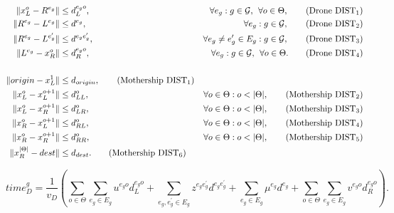 \begin{align*}
\|x_L^o- R^{e_g}\| & \leq  d_L^{e_go},  &\forall e_g:g\in \mathcal{G}, \:\:\forall o\in \Theta, \tag{Drone DIST$_{1}$} \label{eq:drone-d1-async}\\
\|R^{e_g}- L^{e_g}\| & \leq  d^{e_g},  &\forall e_g:g\in \mathcal{G}, \tag{Drone DIST$_{2}$} \label{eq:drone-d2-async}\\
\|R^{e_g}- L^{e'_g}\| & \leq  d^{e_ge'_g}, &\forall e_g\neq e_g'\in E_g:g\in \mathcal{G}, \tag{Drone DIST$_{3}$} \label{eq:drone-d3-async}\\
\|L^{e_g}- x_R^o\| & \leq  d_R^{e_go}, &\forall e_g:g\in \mathcal{G},\:\:\forall o\in \Theta. \tag{Drone DIST$_{4}$} \label{eq:drone-d4-async}\\\\
\|origin - x_L^1\| & \leq d_{origin}, \tag{Mothership DIST$_1$}\label{eq:mothership-d1-async}\\
\|x_L^o - x_L^{o+1}\| & \leq d_{LL}^{o}, &\forall o\in\Theta:o<|\Theta|, \tag{Mothership DIST$_{2}$}\label{eq:mothership-d2-async}\\
\|x_L^o - x_R^{o+1}\| & \leq d_{LR}^{o}, &\forall o\in\Theta:o<|\Theta|, \tag{Mothership DIST$_{3}$}\label{eq:mothership-d3-async}\\
\|x_R^o - x_L^{o+1}\| & \leq d_{RL}^{o}, &\forall o\in\Theta:o<|\Theta|, \tag{Mothership DIST$_{4}$}\label{eq:mothership-d4-async}\\
\|x_R^o - x_R^{o+1}\| & \leq d_{RR}^{o}, &\forall o\in\Theta:o<|\Theta|, \tag{Mothership DIST$_{5}$}\label{eq:mothership-d5-async}\\
\|x_R^{|\Theta|} - dest\| & \leq d_{dest}. \tag{Mothership DIST$_6$}\label{eq:mothership-d6-async}
\end{align*}


\begin{footnotesize}
\begin{equation}\tag{Time$^g_D$}\label{eq:time-g-d}
time_D^g = \frac{1}{v_D}\left(\sum_{o \in \Theta}\sum_{e_g \in E_g} u^{e_g o}d_L^{e_g o} + \sum_{e_g, e^\prime_g\in E_g}z^{e_ge^\prime_g}d^{e_ge^\prime_g} + \sum_{e_g\in E_g} \mu^{e_g}d^{e_g} + \sum_{o \in \Theta}\sum_{e_g \in E_g} v^{e_g o}d_R^{e_g o}\right).
\end{equation}
\end{footnotesize}

